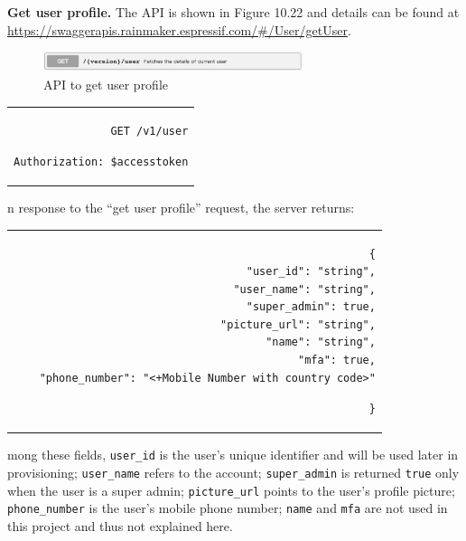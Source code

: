 \documentclass[a4paper,12pt,openany]{book}
\renewcommand{\ttfamily}{\fontfamily{pcr}\selectfont}
\renewcommand{\arraystretch}{1}
\newenvironment{codebloc}{ %
    \ttfamily\footnotesize
    \renewcommand{\arraystretch}{1}
}
\newcommand{\note}[2][NOTE]{ %
\vspace{6pt}
\begin{tabular}{b{\textwidth}}
\hline
\fontfamily{phv}\selectfont \textbf{#1}\\
\leftskip 1em #2\\
\hline
\end{tabular}
}
\begin{document}

\vspace{6pt}
\textbf{Get user profile.} The API is shown in Figure 10.22 and details can be found at \url{https://swaggerapis.rainmaker.espressif.com/\#/User/getUser}.

\begin{figure}[ht]
    \centering
    \includegraphics[width=0.68\textwidth]{D10Z/10-22}
    \caption{API to get user profile}
\end{figure}

\begin{codebloc}
\begin{tabular}{d}
\verb|GET /v1/user|

\verb|Authorization: $accesstoken|
\end{tabular}
\end{codebloc}

In response to the “get user profile” request, the server returns:

\begin{codebloc}
\begin{tabular}{d}
\vspace{2pt}
\begin{verbatim}
{
    "user_id": "string",
    "user_name": "string",
    "super_admin": true,
    "picture_url": "string",
    "name": "string",
    "mfa": true,
    "phone_number": "<+Mobile Number with country code>"
\end{verbatim}
\verb|}|
\end{tabular}
\end{codebloc}

Among these fields, \verb|user_id| is the user’s unique identifier and will be used later in provisioning; \verb|user_name| refers to the account; \verb|super_admin| is returned \verb|true| only when the user is a super admin; \verb|picture_url| points to the user’s profile picture; \verb|phone_number| is the user’s mobile phone number; \verb|name| and \verb|mfa| are not used in this project and thus not explained here.
\end{document}

